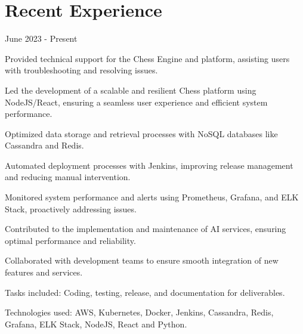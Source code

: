 \section{Recent Experience}

 {June 2023 - Present}
\begin{resume_list}
    \item Provided technical support for the Chess Engine and platform, assisting users with troubleshooting and resolving issues.
    \item Led the development of a scalable and resilient Chess platform using NodeJS/React, ensuring a seamless user experience and efficient system performance.
    \item Optimized data storage and retrieval processes with NoSQL databases like Cassandra and Redis.
    \item Automated deployment processes with Jenkins, improving release management and reducing manual intervention.
    \item Monitored system performance and alerts using Prometheus, Grafana, and ELK Stack, proactively addressing issues.
    \item Contributed to the implementation and maintenance of AI services, ensuring optimal performance and reliability.
    \item Collaborated with development teams to ensure smooth integration of new features and services.
    \item Tasks included: Coding, testing, release, and documentation for deliverables.
    \item Technologies used: AWS, Kubernetes, Docker, Jenkins, Cassandra, Redis, Grafana, ELK Stack, NodeJS, React and Python.
\end{resume_list}

